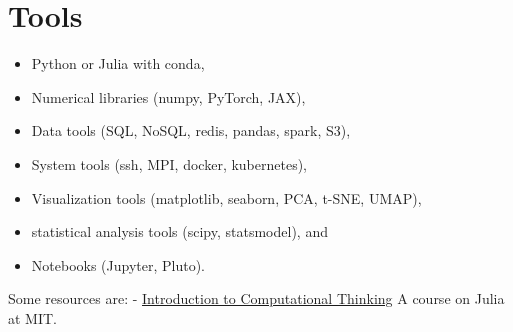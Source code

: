\hypertarget{tools}{%
\section{Tools}\label{tools}}

\begin{itemize}
\tightlist
\item
  Python or Julia with conda,
\item
  Numerical libraries (numpy, PyTorch, JAX),
\item
  Data tools (SQL, NoSQL, redis, pandas, spark, S3),
\item
  System tools (ssh, MPI, docker, kubernetes),
\item
  Visualization tools (matplotlib, seaborn, PCA, t-SNE, UMAP),
\item
  statistical analysis tools (scipy, statsmodel), and
\item
  Notebooks (Jupyter, Pluto).
\end{itemize}

Some resources are: -
\href{https://computationalthinking.mit.edu/Spring21/semesters/}{Introduction
to Computational Thinking} A course on Julia at MIT.
